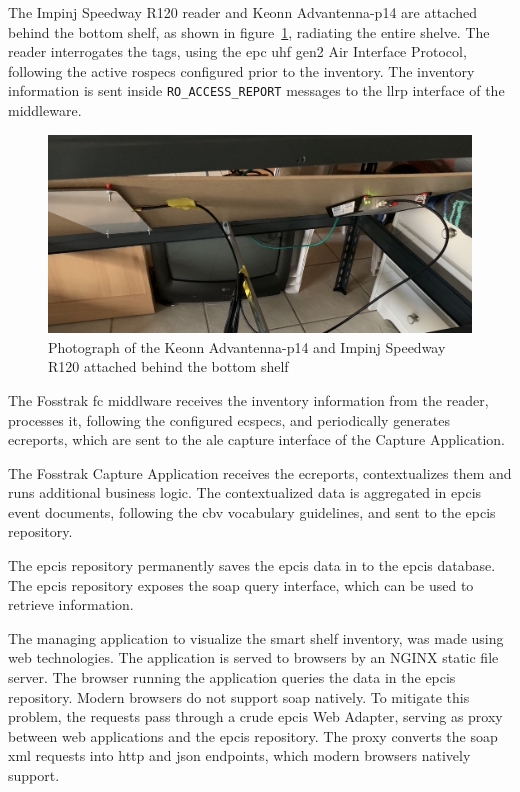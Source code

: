 The Impinj Speedway R120 reader and Keonn Advantenna-p14 are attached behind the bottom shelf, as shown in figure~\ref{fig:shelvephoto}, radiating the entire shelve.
The reader interrogates the tags, using the \ac{epc} \ac{uhf} \ac{gen2} Air Interface Protocol, following the active \acp{rospec} configured prior to the inventory.
The inventory information is sent inside \texttt{RO\_ACCESS\_REPORT} messages to the \ac{llrp} interface of the middleware.

\begin{figure}
    \centering
    \includegraphics[width=\textwidth]{figs/completeshelve_photo.jpeg}
    \caption{Photograph of the Keonn Advantenna-p14 and Impinj Speedway R120 attached behind the bottom shelf}
    \label{fig:shelvephoto}
\end{figure}

The Fosstrak \ac{fc} middlware receives the inventory information from the reader, processes it, following the configured \acp{ecspec}, and periodically generates \acp{ecreport}, which are sent to the \ac{ale} capture interface of the Capture Application.

The Fosstrak Capture Application receives the \acp{ecreport}, contextualizes them and runs additional business logic. The contextualized data is aggregated in \acs{epcis} event documents, following the \ac{cbv} vocabulary guidelines, and sent to the \ac{epcis} repository.

The \ac{epcis} repository permanently saves the \ac{epcis} data in to the \ac{epcis} database. The \ac{epcis} repository exposes the \ac{soap} query interface, which can be used to retrieve information.

The managing application to visualize the smart shelf inventory, was made using web technologies. The application is served to browsers by an NGINX static file server. The browser running the application queries the data in the \ac{epcis} repository.
Modern browsers do not support \ac{soap} natively. 
To mitigate this problem, the requests pass through a crude \ac{epcis} Web Adapter, serving as proxy between web applications and the \ac{epcis} repository. 
The proxy converts the \ac{soap} \ac{xml} requests into \ac{http} and \ac{json} endpoints, which modern browsers natively support.

